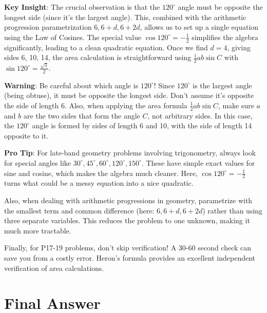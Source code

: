 \documentclass[12pt]{article}
\begin{document}
\begin{keyinsightbox}
\textbf{Key Insight}: The crucial observation is that the $120^\circ$ angle must be opposite the longest side (since it's the largest angle). This, combined with the arithmetic progression parametrization $6, 6+d, 6+2d$, allows us to set up a single equation using the Law of Cosines. The special value $\cos 120^\circ = -\frac{1}{2}$ simplifies the algebra significantly, leading to a clean quadratic equation. Once we find $d = 4$, giving sides 6, 10, 14, the area calculation is straightforward using $\frac{1}{2}ab\sin C$ with $\sin 120^\circ = \frac{\sqrt{3}}{2}$.
\end{keyinsightbox}

\begin{warningbox}
\textbf{Warning}: Be careful about which angle is $120^\circ$! Since $120^\circ$ is the largest angle (being obtuse), it must be opposite the longest side. Don't assume it's opposite the side of length 6. Also, when applying the area formula $\frac{1}{2}ab\sin C$, make sure $a$ and $b$ are the two sides that form the angle $C$, not arbitrary sides. In this case, the $120^\circ$ angle is formed by sides of length 6 and 10, with the side of length 14 opposite to it.
\end{warningbox}

\begin{tipbox}
\textbf{Pro Tip}: For late-band geometry problems involving trigonometry, always look for special angles like $30^\circ, 45^\circ, 60^\circ, 120^\circ, 150^\circ$. These have simple exact values for sine and cosine, which makes the algebra much cleaner. Here, $\cos 120^\circ = -\frac{1}{2}$ turns what could be a messy equation into a nice quadratic.

Also, when dealing with arithmetic progressions in geometry, parametrize with the smallest term and common difference (here: $6, 6+d, 6+2d$) rather than using three separate variables. This reduces the problem to one unknown, making it much more tractable.

Finally, for P17-19 problems, don't skip verification! A 30-60 second check can save you from a costly error. Heron's formula provides an excellent independent verification of area calculations.
\end{tipbox}

\section*{Final Answer}
\end{document}
